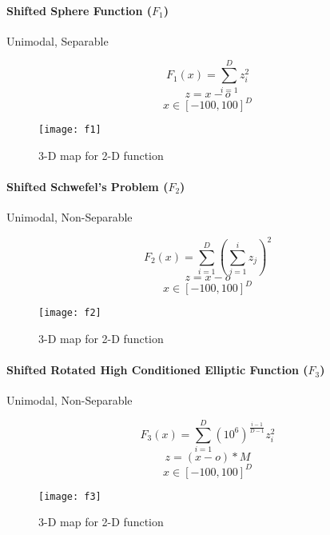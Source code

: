 \paragraph{Shifted Sphere Function ($F_1$)} Unimodal, Separable

\begin{minipage}{.5\textwidth}
  \[
    F_1(x)=\sum_{i=1}^{D}{z_i^2}
  \]
  \[ z=x-o \]
  \[ x \in [-100,100]^D \]
\end{minipage}%
\begin{minipage}{.5\textwidth}
  \begin{figure}[H]
    \centering
    \texttt{[image: f1]}
    \caption{3-D map for 2-D function}
    \label{f1}
  \end{figure}
\end{minipage}


\paragraph{Shifted Schwefel’s Problem ($F_2$)} Unimodal, Non-Separable

\begin{minipage}{.5\textwidth}
\[
  F_2(x)=\sum_{i=1}^{D}{(\sum_{j=1}^{i}{z_j})^2}
\]
\[ z=x-o \]
\[ x \in [-100,100]^D \]
\end{minipage}%
\begin{minipage}{.5\textwidth}
  \begin{figure}[H]
    \centering
    \texttt{[image: f2]}
    \caption{3-D map for 2-D function}
    \label{f2}
  \end{figure}
\end{minipage}


\paragraph{Shifted Rotated High Conditioned Elliptic Function ($F_3$)} Unimodal, Non-Separable

\begin{minipage}{.5\textwidth}
\[
  F_3(x)=\sum_{i=1}^{D}{(10^6)^{\frac{i-1}{D-1}}z_i^2}
\]
\[ z=(x-o)*M \]
\[ x \in [-100,100]^D \]
\end{minipage}%
\begin{minipage}{.5\textwidth}
  \begin{figure}[H]
    \centering
    \texttt{[image: f3]}
    \caption{3-D map for 2-D function}
    \label{f3}
  \end{figure}
\end{minipage}


